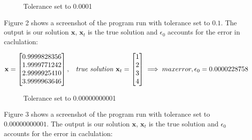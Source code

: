 \documentclass[main]{subfiles}
\begin{document}
\clearpage

    \begin{figure}[t!]
        \caption{Tolerance set to 0.0001}\label{fig:key}
    \end{figure}

    Figure 2 shows a screenshot of the program run with tolerance set to $0.1$. 
    The output is our solution $\textbf{x}$, $\textbf{x}_t$ is the true solution 
    and $\epsilon_0$ accounts for the error in caclulation:
    
    \begin{equation*}
        \textbf{x} = \begin{bmatrix}
            0.9999828356\\
            1.9999771242\\
            2.9999925410\\
            3.9999963646\\
        \end{bmatrix},
        \hspace{3mm}\textit{true solution }\textbf{x}_t = \begin{bmatrix}
            1\\
            2\\
            3\\
            4
        \end{bmatrix}
        \implies max error, \epsilon_0 = 0.0000228758
    \end{equation*}
    \clearpage

    \begin{figure}[t!]
        \caption{Tolerance set to 0.00000000001}\label{fig:key}
    \end{figure}

    Figure 3 shows a screenshot of the program run with tolerance set to $0.00000000001$. 
    The output is our solution $\textbf{x}$, $\textbf{x}_t$ is the true solution 
    and $\epsilon_0$ accounts for the error in caclulation:
    
\end{document}
